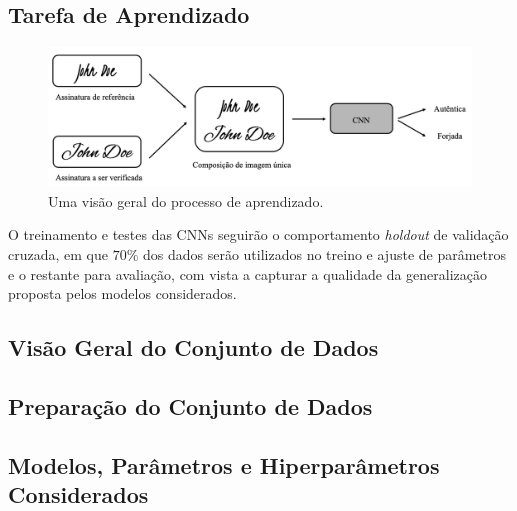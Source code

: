
\subsection{Tarefa de Aprendizado}

\begin{figure}[h!]
\centering
\caption{Uma visão geral do processo de aprendizado.}
\label{fig:esquema-solucao}
\includegraphics[width=\textwidth]{imgs/esquema-solucao}
\end{figure}

O treinamento e testes das CNNs seguirão o comportamento \emph{holdout} de validação
cruzada, em que $70\%$ dos dados serão utilizados no treino e ajuste de parâmetros e o
restante para avaliação, com vista a capturar a qualidade da generalização proposta pelos
modelos considerados.

\subsection{Visão Geral do Conjunto de Dados}


\subsection{Preparação do Conjunto de Dados}


\subsection{Modelos, Parâmetros e Hiperparâmetros Considerados}
